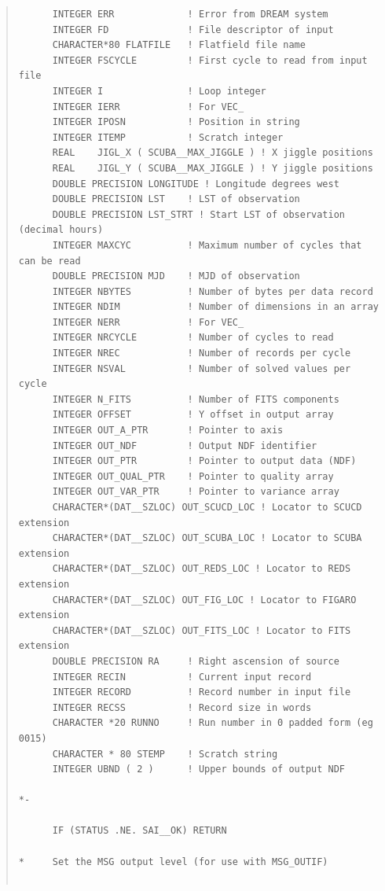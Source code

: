 \documentclass[twoside,11pt]{article}
\newenvironment{myquote}{\begin{quote}\begin{small}}{\end{small}\end{quote}}
\renewcommand{\_}{\texttt{\symbol{95}}}
\begin{document}
\begin{myquote}
\begin{verbatim}
      INTEGER ERR             ! Error from DREAM system
      INTEGER FD              ! File descriptor of input
      CHARACTER*80 FLATFILE   ! Flatfield file name
      INTEGER FSCYCLE         ! First cycle to read from input file
      INTEGER I               ! Loop integer
      INTEGER IERR            ! For VEC_
      INTEGER IPOSN           ! Position in string
      INTEGER ITEMP           ! Scratch integer
      REAL    JIGL_X ( SCUBA__MAX_JIGGLE ) ! X jiggle positions
      REAL    JIGL_Y ( SCUBA__MAX_JIGGLE ) ! Y jiggle positions
      DOUBLE PRECISION LONGITUDE ! Longitude degrees west
      DOUBLE PRECISION LST    ! LST of observation
      DOUBLE PRECISION LST_STRT ! Start LST of observation (decimal hours)
      INTEGER MAXCYC          ! Maximum number of cycles that can be read
      DOUBLE PRECISION MJD    ! MJD of observation
      INTEGER NBYTES          ! Number of bytes per data record
      INTEGER NDIM            ! Number of dimensions in an array
      INTEGER NERR            ! For VEC_
      INTEGER NRCYCLE         ! Number of cycles to read
      INTEGER NREC            ! Number of records per cycle
      INTEGER NSVAL           ! Number of solved values per cycle
      INTEGER N_FITS          ! Number of FITS components
      INTEGER OFFSET          ! Y offset in output array
      INTEGER OUT_A_PTR       ! Pointer to axis
      INTEGER OUT_NDF         ! Output NDF identifier
      INTEGER OUT_PTR         ! Pointer to output data (NDF)
      INTEGER OUT_QUAL_PTR    ! Pointer to quality array
      INTEGER OUT_VAR_PTR     ! Pointer to variance array
      CHARACTER*(DAT__SZLOC) OUT_SCUCD_LOC ! Locator to SCUCD extension
      CHARACTER*(DAT__SZLOC) OUT_SCUBA_LOC ! Locator to SCUBA extension
      CHARACTER*(DAT__SZLOC) OUT_REDS_LOC ! Locator to REDS extension
      CHARACTER*(DAT__SZLOC) OUT_FIG_LOC ! Locator to FIGARO extension
      CHARACTER*(DAT__SZLOC) OUT_FITS_LOC ! Locator to FITS extension
      DOUBLE PRECISION RA     ! Right ascension of source
      INTEGER RECIN           ! Current input record
      INTEGER RECORD          ! Record number in input file
      INTEGER RECSS           ! Record size in words
      CHARACTER *20 RUNNO     ! Run number in 0 padded form (eg 0015)
      CHARACTER * 80 STEMP    ! Scratch string
      INTEGER UBND ( 2 )      ! Upper bounds of output NDF

*-

      IF (STATUS .NE. SAI__OK) RETURN

*     Set the MSG output level (for use with MSG_OUTIF)


\end{verbatim}
\end{myquote}
\end{document}

